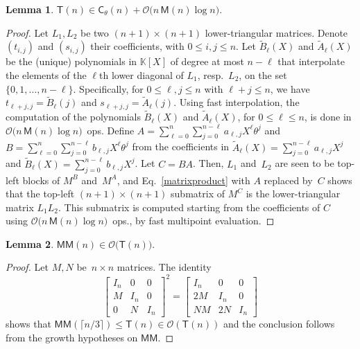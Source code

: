 \documentclass{sig-alt-full}
\newcommand{\x}{X}
\newcommand{\Tx}{\theta}
\newcommand{\bigO}{{\mathcal{O}}}
\newcommand{\MM}{\mathsf{MM}}
\newcommand{\sC}{\mathsf{C}}
\newcommand{\sM}{\mathsf{M}}
\newcommand{\sT}{\mathsf{T}}
\newcommand{\bK}{\mathbb{K}}
\newtheorem{lemma}{Lemma}
\begin{document}
\begin{lemma}\label{fromDiffMulToT}
  $\sT(n) \in \sC_\Tx(n) +  \bigO\bigl(n\,\sM(n) \log n\bigr).$
\end{lemma}

\begin{proof}
Let $L_1,L_2$ be two $(n+1) \times (n+1)$ lower-triangular matrices.
Denote $(t_{i,j})$ and $(s_{i,j})$ their coefficients, with $0\leq i,j \leq n$.
Let $\tilde B_\ell(\x)$ and $\tilde A_\ell(\x)$ be the (unique) polynomials in $\bK[\x]$ of degree at most $n-\ell$ that interpolate the elements of the $\ell$th lower diagonal of $L_1$, resp.\ $L_2$, on the set $\{0,1,\ldots,n-\ell\}$.
Specifically, for $0\leq \ell,j \leq n$ with $\ell + j \leq n$, we have $t_{\ell+j,j} = \tilde B_\ell(j) $ and $ s_{\ell+j,j} = \tilde A_\ell(j)$.
Using fast interpolation, the computation of the polynomials $\tilde B_\ell(\x)$ and $\tilde A_\ell(\x)$, for $0\leq \ell \leq n$, is done in $\bigO\bigl(n \,\sM(n) \log n\bigr)$~ops.
Define $A=\sum_{\ell=0}^n \sum_{j=0}^{n-\ell} a_{\ell,j} \x^\ell \Tx^j$ and $B=\sum_{\ell=0}^n \sum_{j=0}^{n-\ell} b_{\ell,j} \x^\ell \Tx^j$ from the coefficients in
$\tilde A_\ell(\x) = \sum_{j=0}^{n-\ell} a_{\ell,j}\x^j$ and $\tilde B_\ell(\x) = \sum_{j=0}^{n-\ell} b_{\ell,j}\x^j$.
Let $C=BA$.
Then, $L_1$ and~$L_2$ are seen to be top-left blocks of $M^B$ and~$M^A$, and Eq.~\eqref{matrixproduct} with $A$ replaced by~$C$ shows that the top-left $(n+1) \times (n+1)$ submatrix of $M^C$ is the lower-triangular matrix $L_1 L_2$.
This submatrix is computed starting from the coefficients of $C$ using  $\bigO\bigl(n\, \sM(n) \log n\bigr)$~ops., by fast multipoint evaluation.
\end{proof}

\begin{lemma}\label{fromTtoOmega}
 $\MM(n)  \in \bigO\bigl(\sT(n)\bigr).$
\end{lemma}


\begin{proof}
Let $M, N$ be~$n\times n$ matrices. The identity
\[
\begin{bmatrix}
I_n& 0 & 0 \\
M & I_n & 0 \\
0 & N & I_n
\end{bmatrix}^2
=
\begin{bmatrix}
I_n& 0 & 0 \\
2M & I_n & 0 \\
NM & 2N & I_n
\end{bmatrix}
\]
shows that $\MM(\lceil n/3 \rceil) \leq \sT(n) \in \bigO(\sT(n))$ and the conclusion follows from the growth hypotheses on  $\MM$.
\end{proof}
\end{document}
